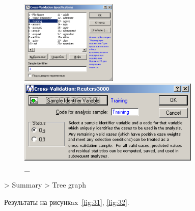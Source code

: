 \begin{figure}[!h]
  \centering

  \begin{minipage}{0.49\textwidth}
    \centering

    \includegraphics[height=4cm]
    {inc/29.PNG}

    \caption{\_}

    \label{fig:29}
  \end{minipage}
  \begin{minipage}{0.49\textwidth}
    \centering

    \includegraphics[height=4cm]
    {inc/30.PNG}

    \caption{\_}

    \label{fig:30}
  \end{minipage}
\end{figure}

\newpage

> Summary > Tree graph

Результаты на рисункax~\ref{fig:31}, \ref{fig:32}.

